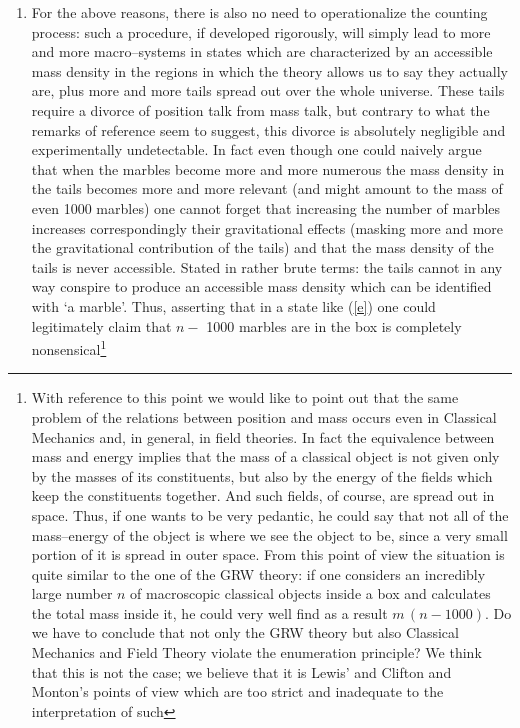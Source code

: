 \documentclass[10pt,a4paper]{article}
\begin{document}
\begin{enumerate}
\item For the above reasons, there is also no need to
operationalize the counting process: such a procedure, if
developed rigorously, will simply lead to more and more
macro--systems in states which are characterized by an accessible
mass density in the regions in which the theory allows us to say
they actually are, plus more and more tails spread out over the
whole universe. These tails require a divorce of position talk
from mass talk,  but contrary to what the remarks of reference
\cite{cli2} seem to suggest, this divorce is absolutely negligible
and experimentally undetectable. In fact even though one could
naively argue that when the marbles become more and more numerous
the mass density in the tails becomes more and more relevant (and
might amount to the mass of even 1000 marbles) one cannot forget
that increasing the number of marbles increases correspondingly
their gravitational effects (masking more and more the
gravitational contribution of the tails) and that the mass density
of the tails is never accessible. Stated in rather brute terms:
the tails cannot in any way conspire to produce an accessible mass
density which can be identified with `a marble'. Thus, asserting
that in a state like (\ref{e}) one could legitimately claim that
$n-$ 1000 marbles are in the box is completely
nonsensical\footnote{With reference to this point we would like to
point out that the same problem of the relations between position
and mass occurs even in Classical Mechanics and, in general, in
field theories. In fact the equivalence between mass and energy
implies that the mass of a classical object is not given only by
the masses of its constituents, but also by the energy of the
fields which keep the constituents together. And such fields, of
course, are spread out in space. Thus, if one wants to be very
pedantic, he could say that not all of the mass--energy of the
object is where we see the object to be, since a very small
portion of it is spread in outer space. From this point of view
the situation is quite similar to the one of the GRW theory: if
one considers an incredibly large number $n$ of macroscopic
classical objects inside a box and calculates the total mass
inside it, he could very well find as a result $m\,(n-1000)$. Do
we have to conclude that not only the GRW theory but also
Classical Mechanics and Field Theory violate the enumeration
principle? We think that this is not the case; we believe that it
is Lewis' and Clifton and Monton's points of view which are too
 strict and inadequate to the interpretation of such
}
\end{enumerate}
\end{document}
